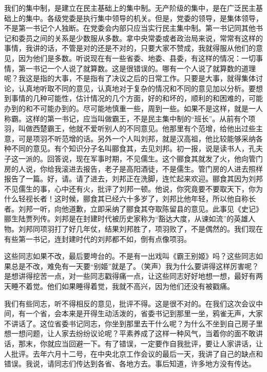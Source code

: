 我们的集中制，是建立在民主基础上的集中制。无产阶级的集中，是在广泛民主基础上的集中。各级党委是执行集中领导的机关。但是，党委的领导，是集体领导，不是第一书记个人独断。在党委会内部只应当实行民主集中制。第一书记同其他书记和委员之间的关系是少数服从多数。拿中央常委或者政治局来说，常常有这样的事情，我讲的话，不管是对的还是不对的，只要大家不赞成，我就得服从他们的意见，因为他们是多数。听说现在有一些省委、地委、县委，有这样的情况：一切事情，第一书记一个人说了就算数。这是很错误的。哪有一个人说了就算数的道理呢？我这是指的大事，不是指有了决议之后的日常工作。只要是大事，就得集体讨论，认真地听取不同的意见，认真地对于复杂的情况和不同的意见加以分析。要想到事情的几种可能性，估计情况的几个方面，好的和坏的，顺利的和困难的，可能办到的和不可能办到的。尽可能地慎重一些，周到一些。如果不是这样，就是一人称霸。这样的第一书记，应当叫做霸王，不是民主集中制的“班长”。从前有个项羽，叫做西楚霸王，他就不爱听别人的不同意见。他那里有个范增，给他出过些主意，可是项羽不听范增的话。另外一个人叫刘邦，就是汉高祖，他比较能够采纳各种不同的意见。有个知识分子名叫郦食其，去见刘邦。初一报，说是读书人，孔夫子这一派的。回答说，现在军事时期，不见儒生。这个郦食其就发了火，他向管门房的人说，你给我滚进去报告，老子是高阳酒徒，不是儒生。管门房的人进去照样报告了一篇。好，请。请了进去，刘邦正在洗脚，连忙起来欢迎。郦食其因为刘邦不见儒生的事，心中还有火，批评了刘邦一顿。他说，你究竟要不要取天下，你为什么轻视长者！这时候，郦食其已经六十多岁了，刘邦比他年轻，所以他自称长者。刘邦一听，向他道歉，立即采纳了郦食其夺取陈留县的意见。此事见《史记》郦生陆贾列传。刘邦是在封建时代被历史家称为“豁达大度，从谏如流”的英雄人物。刘邦同项羽打了好几年仗，结果刘邦胜了，项羽败了，不是偶然的。我们现在有些第一书记，连封建时代的刘邦都不如，倒有点像项羽。

这些同志如果不改，最后要垮台的。不是有一出戏叫《霸王别姬》吗？这些同志如果总是不改，难免有一天要“别姬”就是了。（笑声）我为什么要讲得这样厉害呢？是想讲得挖苦一点，对一些同志戳得痛一点，让这些同志好好地想一想，最好有两天睡不着觉。他们如果睡得着觉，我就不高兴，因为他们还没有被戳痛。

我们有些同志，听不得相反的意见，批评不得。这是很不对的。在我们这次会议中间，有一个省，会本来是开得生动活泼的，省委书记到那里一坐，鸦雀无声，大家不讲话了。这位省委书记同志，你坐到那里去干什么呢？为什么不坐到自己房子里想一想问题，让人家去纷纷议论呢？平素养成了这样一种风气，当着你的面不敢讲话，那末，你就应当回避一下。有了错误，一定要作自我批评，要让人家讲话，让人批评。去年六月十二号，在中央北京工作会议的最后一天，我讲了自己的缺点和错误。我说，请同志们传达到各省、各地方去。事后知道，许多地方没有传达。

